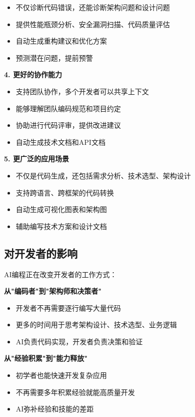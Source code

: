 \documentclass[12pt,a4paper]{article}
\begin{document}
\begin{itemize}
\begin{itemize}
    \item 不仅诊断代码错误，还能诊断架构问题和设计问题
    \item 提供性能瓶颈分析、安全漏洞扫描、代码质量评估
    \item 自动生成重构建议和优化方案
    \item 预测潜在问题，提前预警
\end{itemize}

\textbf{4. 更好的协作能力}

\begin{itemize}
    \item 支持团队协作，多个开发者可以共享上下文
    \item 能够理解团队编码规范和项目约定
    \item 协助进行代码评审，提供改进建议
    \item 自动生成技术文档和API文档
\end{itemize}

\textbf{5. 更广泛的应用场景}

\begin{itemize}
    \item 不仅是代码生成，还包括需求分析、技术选型、架构设计
    \item 支持跨语言、跨框架的代码转换
    \item 自动生成可视化图表和架构图
    \item 辅助编写技术方案和设计文档
\end{itemize}

\subsection{对开发者的影响}

AI编程正在改变开发者的工作方式：

\textbf{从"编码者"到"架构师和决策者"}

\begin{itemize}
    \item 开发者不再需要逐行编写大量代码
    \item 更多的时间用于思考架构设计、技术选型、业务逻辑
    \item AI负责代码实现，开发者负责决策和验证
\end{itemize}

\textbf{从"经验积累"到"能力释放"}

\begin{itemize}
    \item 初学者也能快速开发复杂应用
    \item 不再需要多年积累经验就能高质量开发
    \item AI弥补经验和技能的差距
\end{itemize}


\end{itemize}
\end{document}
